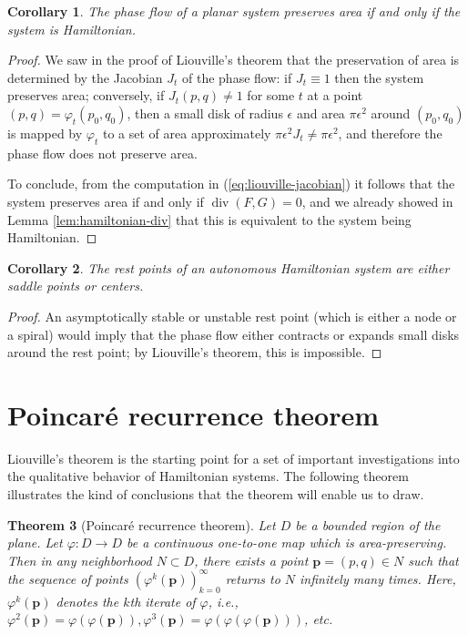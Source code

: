 \documentclass[11pt]{report}
\theoremstyle{plain}
\newtheorem{thm}{Theorem}[chapter]
\newtheorem{cor}[thm]{Corollary}
\theoremstyle{definition}
\begin{document}
\begin{cor}
The phase flow of a planar system preserves area if
and only if the system is Hamiltonian.
\end{cor}

\begin{proof}
We saw in the proof of Liouville's theorem that the
preservation of area is determined by the Jacobian
$J_t$ of the phase flow: if $J_t \equiv 1$ then the
system preserves area; conversely, if $J_t(p,q)\neq 1$
for some $t$ at a point $(p,q)=\varphi_t(p_0,q_0)$,
then a small disk of radius $\epsilon$ and area
$\pi \epsilon^2$ around $(p_0,q_0)$ is mapped by
$\varphi_t$ to a set of area approximately
$\pi \epsilon^2 J_t \neq \pi \epsilon^2$, and
therefore the phase flow does not preserve area.

To conclude, from the computation in
(\ref{eq:liouville-jacobian}) it follows that the system
preserves area if and only if
$\operatorname{div}(F,G)=0$, and we already showed in
Lemma \ref{lem:hamiltonian-div} that this is equivalent to
the system being Hamiltonian.
\end{proof}

\begin{cor}
The rest points of an autonomous Hamiltonian system
are either saddle points or centers.
\end{cor}

\begin{proof}
An asymptotically stable or unstable rest point
(which is either a node or a spiral) would imply that
the phase flow either contracts or expands small disks
around the rest point; by Liouville's theorem, this is
impossible.
\end{proof}

\section{Poincaré recurrence theorem}
Liouville's theorem is the starting point for a set
of important investigations into the qualitative
behavior of Hamiltonian systems. The following theorem
illustrates the kind of conclusions that the theorem
will enable us to draw.

\begin{thm}[Poincaré recurrence theorem]
\label{thm:poincare-recurrence}
Let $D$ be a bounded region of the plane. Let
$\varphi:D\to D$ be a continuous one-to-one map which
is area-preserving. Then in any neighborhood
$N\subset D$, there exists a point
$\mathbf{p}=(p,q) \in N$ such that the sequence of
points $(\varphi^k(\mathbf{p}))_{k=0}^\infty$ returns
to $N$ infinitely many times. Here,
$\varphi^k(\mathbf{p})$ denotes the \emph{$k$th iterate of
$\varphi$}, i.e.,
$\varphi^2(\mathbf{p})=\varphi(\varphi(\mathbf{p})),
\varphi^3(\mathbf{p})=\varphi(\varphi(\varphi(\mathbf{p})))$,
etc.
\end{thm}
\end{document}
